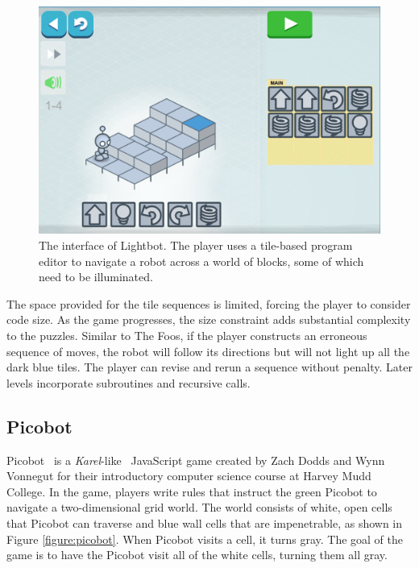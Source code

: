 \documentclass{sig-alternate-05-2015}
\begin{document}
\begin{figure}[tb]
\centering
\includegraphics[width=\linewidth]{images/image04.png}
\caption{The interface of Lightbot. The player uses a tile-based program editor to navigate a robot across a world of blocks, some of which need to be illuminated.}
\label{figure:lightbot}
\end{figure}


The space provided for the tile sequences is limited, forcing the player to consider code size. As the game progresses, the size constraint adds substantial complexity to the puzzles. Similar to The Foos, if the player constructs an erroneous sequence of moves, the robot will follow its directions but will not light up all the dark blue tiles. The player can revise and rerun a sequence without penalty. Later levels incorporate subroutines and recursive calls.\subsection{Picobot}


Picobot~\cite{picobot} is a {\em Karel}-like~\cite{pattis1981karel} JavaScript game created by Zach Dodds and Wynn Vonnegut for their introductory computer science course at Harvey Mudd College. In the game, players write rules that instruct the green Picobot to navigate a two-dimensional grid world. The world consists of white, open cells that Picobot can traverse and blue wall cells that are impenetrable, as shown in Figure \ref{figure:picobot}. When Picobot visits a cell, it turns gray. The goal of the game is to have the Picobot visit all of the white cells, turning them all gray.
\end{document}
